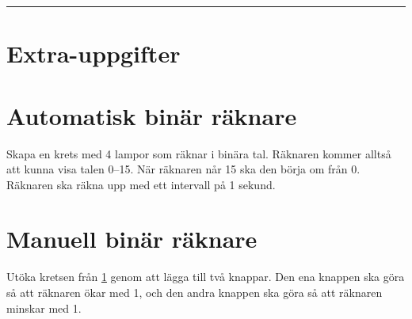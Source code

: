 \documentclass[11pt]{article}
\begin{document}
\newpage\hrule
\section*{Extra-uppgifter}

\section{Automatisk binär räknare}\label{sec:binar-raknare}
Skapa en krets med 4 lampor som räknar i binära tal. Räknaren kommer alltså att
kunna visa talen 0--15. När räknaren når 15 ska den börja om från 0. Räknaren
ska räkna upp med ett intervall på 1 sekund.

\section{Manuell binär räknare}\label{sec:manuell-binar-raknare}
Utöka kretsen från \ref{sec:binar-raknare} genom att lägga till två knappar.
Den ena knappen ska göra så att räknaren ökar med 1, och den andra knappen ska
göra så att räknaren minskar med 1.
\end{document}
